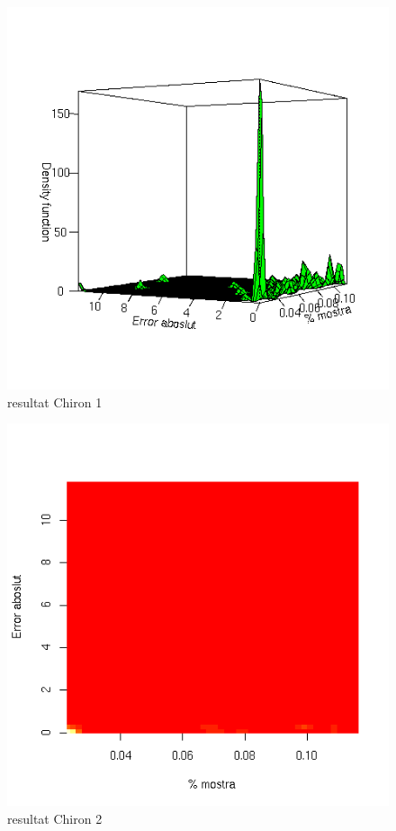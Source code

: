\documentclass[titlepage,a4paper,12pt]{book}
\begin{document}
	\begin{figure}[tbp]
		\begin{center}
			\includegraphics[scale=0.75]{chiron/rgrau1.png}
		\end{center}
		\caption{resultat Chiron 1}
		\label{fig:resChir1}
	\end{figure}

	\begin{figure}[tbp]
		\begin{center}
			\includegraphics[scale=0.75]{chiron/rgrau2.png}
		\end{center}
		\caption{resultat Chiron 2}
		\label{fig:resChir2}
	\end{figure}
\end{document}
